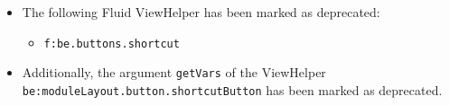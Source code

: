 \begin{frame}[fragile]
\begin{itemize}
		\item The following Fluid ViewHelper has been marked as deprecated:

			\begin{itemize}\smaller
				\item \texttt{f:be.buttons.shortcut}
			\end{itemize}\normalsize

		\item Additionally, the argument \texttt{getVars} of the ViewHelper
			\texttt{be:moduleLayout.button.shortcutButton} has been marked as deprecated.

	\end{itemize}

\end{frame}

